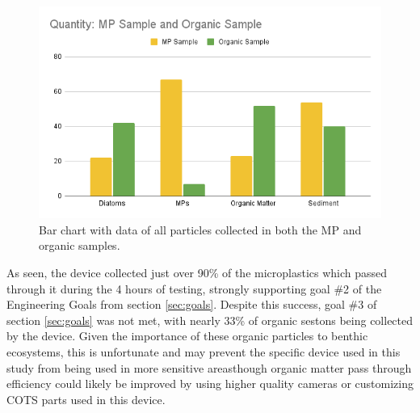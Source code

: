 \documentclass[fleqn,10pt]{SelfArx} %
\begin{document}
	\begin{figure}[h]
		\centering
		\includegraphics[width=1\linewidth]{Figures/MPOrganicCounting}
		\caption[Collected Particle Classification]{Bar chart with data of all particles collected in both the MP and organic samples.}
		\label{fig:mpcounting}
	\end{figure}
	
	As seen, the device collected just over 90\% of the microplastics which passed through it during the 4 hours of testing, strongly supporting goal \#2 of the Engineering Goals from section \ref{sec:goals}. Despite this success, goal \#3 of section \ref{sec:goals} was not met, with nearly 33\% of organic \glspl{seston} being collected by the device. Given the importance of these organic particles to \gls{benthic} ecosystems, this is unfortunate and may prevent the specific device used in this study from being used in more sensitive areas\textemdash though organic matter pass through efficiency could likely be improved by using higher quality cameras or customizing COTS parts used in this device.
	
\end{document}
